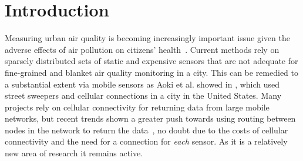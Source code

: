 \chapter{Introduction}\label{introduction}



    Measuring urban air quality is becoming increasingly important issue given the adverse effects of air pollution on citizens' health~\cite{beijing2point5high}. Current methods rely on sparsely distributed sets of static and expensive sensors that are not adequate for fine-grained and blanket air quality monitoring in a city. This can be remedied to a substantial extent via mobile sensors as Aoki et al. showed in \cite{vehicleforresearch}, which used street sweepers and cellular connections in a city in the United States. Many projects rely on cellular connectivity for returning data from large mobile networks, but recent trends shown a greater push towards using routing between nodes in the network to return the data~\cite{manetmessaging,cafnet,cartel,commonsense}, no doubt due to the costs of cellular connectivity and the need for a connection for \emph{each} sensor. As it is a relatively new area of research it remains active. 

